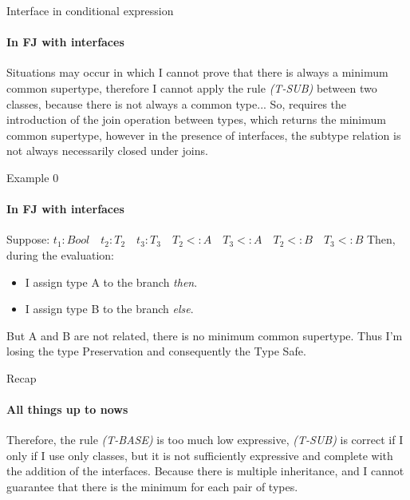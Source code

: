 \documentclass{beamer}
\begin{document}
\begin{frame}{Interface in conditional expression}
    \framesubtitle{In FJ with interfaces}
    Situations may occur in which I cannot prove that there is always a minimum common supertype, therefore I cannot apply the rule \textit{(T-SUB)} between two classes, because there is not always a common type...\newline
 So, requires the introduction of the join operation between types, which returns the minimum common supertype, however in the presence of interfaces, the subtype relation is not always necessarily closed under joins. 
\end{frame}

\begin{frame}{Example 0}
    \framesubtitle{In FJ with interfaces}
Suppose: $t_1 : Bool \quad t_2 : T_2 \quad t_3 : T_3 \quad T_2 <:A \quad T_3 <: A \quad T_2 <: B \quad T_3 <: B$
Then, during the evaluation:
\begin{itemize}
    \item I assign type A to the branch \textit{then}.
    \item I assign type B to the branch \textit{else}.
\end{itemize}
But A and B are not related, there is no minimum common supertype. Thus I'm losing the type Preservation and consequently the Type Safe.

\begin{center}
\end{center}
 \end{frame}

\begin{frame}{Recap}
	\framesubtitle{All things up to nows}
Therefore, the rule \textit{(T-BASE)} is too much low expressive, \textit{(T-SUB)} is correct if I only if I use only classes, but it is not sufficiently expressive and complete with the addition of the interfaces.\newline\newline
Because there is multiple inheritance, and I cannot guarantee that there is the minimum for each pair of types.
    
\end{frame}
\end{document}
